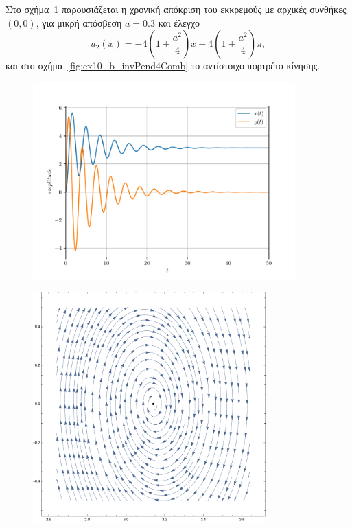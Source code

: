 \begin{solution}
    Στο σχήμα~\ref{fig:ex10_b_invPend4a} παρουσιάζεται η χρονική απόκριση του
    εκκρεμούς με αρχικές συνθήκες \( (0, 0) \), για μικρή απόσβεση \( a = 0.3 \)
    και έλεγχο
    \[
        u_2(x) = -4\left(1 + \frac{a^2}{4}\right)x +
        4\left(1 + \frac{a^2}{4}\right)\pi,
    \]
    και στο σχήμα~\ref{fig:ex10_b_invPend4Comb} το αντίστοιχο πορτρέτο κίνησης.
    \begin{figure}[h]
        \centering
        \includegraphics[width=0.9\textwidth]{figures/ex10_b_invPend4a.pdf}
        \caption{}
        \label{fig:ex10_b_invPend4a}
    \end{figure}
    \begin{figure}[h]
        \centering
        \includegraphics[width=0.8\textwidth]{figures/ex10_b_invPend4Comb.pdf}

\end{figure}
\end{solution}
